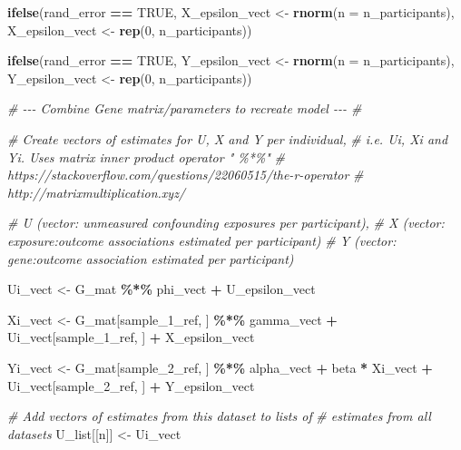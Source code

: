 \documentclass[
]{article}
\newenvironment{Shaded}{\begin{snugshade}}{\end{snugshade}}
\newcommand{\AttributeTok}[1]{\textcolor[rgb]{0.13,0.29,0.53}{#1}}
\newcommand{\CommentTok}[1]{\textcolor[rgb]{0.56,0.35,0.01}{\textit{#1}}}
\newcommand{\ConstantTok}[1]{\textcolor[rgb]{0.56,0.35,0.01}{#1}}
\newcommand{\DecValTok}[1]{\textcolor[rgb]{0.00,0.00,0.81}{#1}}
\newcommand{\FunctionTok}[1]{\textcolor[rgb]{0.13,0.29,0.53}{\textbf{#1}}}
\newcommand{\NormalTok}[1]{#1}
\newcommand{\OtherTok}[1]{\textcolor[rgb]{0.56,0.35,0.01}{#1}}
\newcommand{\SpecialCharTok}[1]{\textcolor[rgb]{0.81,0.36,0.00}{\textbf{#1}}}
\begin{document}
\begin{Shaded}
\begin{Highlighting}[]
    \FunctionTok{ifelse}\NormalTok{(rand\_error }\SpecialCharTok{==} \ConstantTok{TRUE}\NormalTok{,}
\NormalTok{           X\_epsilon\_vect }\OtherTok{\textless{}{-}} \FunctionTok{rnorm}\NormalTok{(}\AttributeTok{n =}\NormalTok{ n\_participants),}
\NormalTok{           X\_epsilon\_vect }\OtherTok{\textless{}{-}} \FunctionTok{rep}\NormalTok{(}\DecValTok{0}\NormalTok{, n\_participants))}
    
    \FunctionTok{ifelse}\NormalTok{(rand\_error }\SpecialCharTok{==} \ConstantTok{TRUE}\NormalTok{,}
\NormalTok{           Y\_epsilon\_vect }\OtherTok{\textless{}{-}} \FunctionTok{rnorm}\NormalTok{(}\AttributeTok{n =}\NormalTok{ n\_participants),}
\NormalTok{           Y\_epsilon\_vect }\OtherTok{\textless{}{-}} \FunctionTok{rep}\NormalTok{(}\DecValTok{0}\NormalTok{, n\_participants))}
    
    
    \CommentTok{\# {-}{-}{-} Combine Gene matrix/parameters to recreate model {-}{-}{-} \#}
    
    \CommentTok{\# Create vectors of estimates for U, X and Y per individual,}
    \CommentTok{\# i.e. Ui, Xi and Yi. Uses matrix inner product operator " \%*\%" }
    \CommentTok{\# https://stackoverflow.com/questions/22060515/the{-}r{-}operator }
    \CommentTok{\# http://matrixmultiplication.xyz/}
    
    \CommentTok{\#     U (vector: unmeasured confounding exposures per participant), }
    \CommentTok{\#     X (vector: exposure:outcome associations estimated per participant) }
    \CommentTok{\#     Y (vector: gene:outcome association estimated per participant) }
    
\NormalTok{    Ui\_vect }\OtherTok{\textless{}{-}}\NormalTok{  G\_mat }\SpecialCharTok{\%*\%}\NormalTok{ phi\_vect }\SpecialCharTok{+}\NormalTok{ U\_epsilon\_vect}
    
\NormalTok{    Xi\_vect }\OtherTok{\textless{}{-}}\NormalTok{  G\_mat[sample\_1\_ref, ] }\SpecialCharTok{\%*\%}\NormalTok{ gamma\_vect }\SpecialCharTok{+} 
\NormalTok{      Ui\_vect[sample\_1\_ref, ] }\SpecialCharTok{+} 
\NormalTok{      X\_epsilon\_vect}
    
\NormalTok{    Yi\_vect }\OtherTok{\textless{}{-}}\NormalTok{  G\_mat[sample\_2\_ref, ] }\SpecialCharTok{\%*\%}\NormalTok{ alpha\_vect }\SpecialCharTok{+} 
\NormalTok{      beta }\SpecialCharTok{*}\NormalTok{ Xi\_vect }\SpecialCharTok{+} 
\NormalTok{      Ui\_vect[sample\_2\_ref, ] }\SpecialCharTok{+} 
\NormalTok{      Y\_epsilon\_vect}
    
    
    \CommentTok{\# Add vectors of estimates from this dataset to lists of }
    \CommentTok{\# estimates from all datasets}
\NormalTok{    U\_list[[n]] }\OtherTok{\textless{}{-}}\NormalTok{ Ui\_vect}
    

\end{Highlighting}
\end{Shaded}
\end{document}
